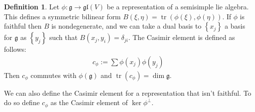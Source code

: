 \documentclass[10.5pt]{article}
\theoremstyle{definition}
\newtheorem{definition}{Definition}
\numberwithin{example}{subsection}
\numberwithin{proposition}{subsection}
\numberwithin{pb}{subsection}
\newcommand{\set}[1]{\left\{#1\right\}}
\begin{document}
        \begin{definition}\label{casimir}
            Let \(\phi: \mathfrak{g} \to \mathfrak{gl}(V)\) be a representation of a semisimple lie algebra. This defines a symmetric bilinear form \(B(\xi,\eta) = \operatorname{tr}(\phi(\xi),\phi(\eta))\). If \(\phi\) is faithful then \(B\) is nondegenerate, and we can take a dual basis to \(\set{x_j}\) a basis for \(\mathfrak{g}\) as \(\set{y_j}\) such that \(B(x_j,y_i) = \delta_{ji}\). The Casimir element is defined as follows:
            \begin{align}
                c_\phi := \sum \phi(x_j)\phi(y_j)
            \end{align}
            Then \(c_\phi\) commutes with \(\phi(\mathfrak{g})\) and \(\operatorname{tr}(c_\phi) = \dim \mathfrak{g}\).

            We can also define the Casimir element for a representation that isn't faithful. To do so define \(c_{\phi}\) as the Casimir element of \(\ker\phi^{\perp}\).
        \end{definition}
\end{document}
